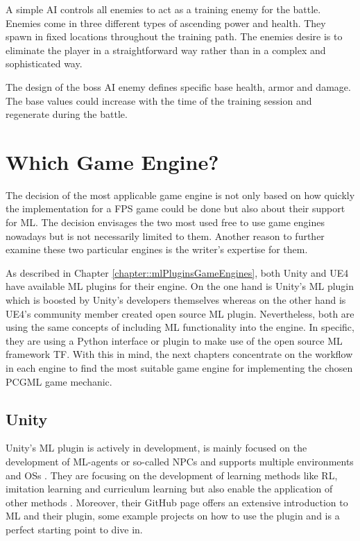 \documentclass[MGS,Master,english]{twbook}%
\begin{document}
A simple \ac{AI} controls all enemies to act as a training enemy for the battle. Enemies come in three different types of ascending power and health. They spawn in fixed locations throughout the training path. The enemies desire is to eliminate the player in a straightforward way rather than in a complex and sophisticated way. 

The design of the boss \ac{AI} enemy defines specific base health, armor and damage. The base values could increase with the time of the training session and regenerate during the battle.

\section{Which Game Engine?} \label{whichGameEngine}
The decision of the most applicable game engine is not only based on how quickly the implementation for a \ac{FPS} game could be done but also about their support for \ac{ML}. The decision envisages the two most used free to use game engines nowadays but is not necessarily limited to them. Another reason to further examine these two particular engines is the writer's expertise for them.

As described in Chapter \ref{chapter::mlPluginsGameEngines}, both Unity and \ac{UE4} have available \ac{ML} plugins for their engine. On the one hand is Unity's \ac{ML} plugin which is boosted by Unity’s developers themselves whereas on the other hand is \ac{UE4}’s community member created open source \ac{ML} plugin. Nevertheless, both are using the same concepts of including \ac{ML} functionality into the engine. In specific, they are using a Python interface or plugin to make use of the open source \ac{ML} framework \acf{TF}. With this in mind, the next chapters concentrate on the workflow in each engine to find the most suitable game engine for implementing the chosen \ac{PCGML} game mechanic.

\subsection{Unity}
Unity's \ac{ML} plugin is actively in development, is mainly focused on the development of \ac{ML}-agents or so-called \acp{NPC} and supports multiple environments and \acp{OS} \cite{unity::mlGithub}. They are focusing on the development of learning methods like \ac{RL}, imitation learning and curriculum learning but also enable the application of other methods \cite{unity::mlGithub}. Moreover, their GitHub page offers an extensive introduction to \ac{ML} and their plugin, some example projects on how to use the plugin and is a perfect starting point to dive in. 
\end{document}
